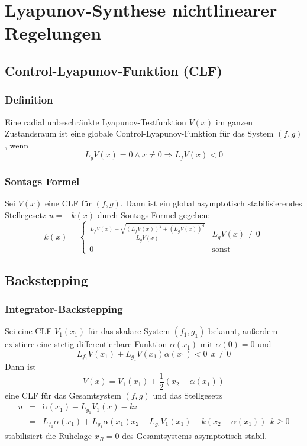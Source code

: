 \chapter{Lyapunov-Synthese nichtlinearer Regelungen}
\section{Control-Lyapunov-Funktion (CLF)}
\subsection{Definition}
Eine radial unbeschränkte Lyapunov-Testfunktion $V(x)$ im ganzen Zustandsraum ist eine
globale Control-Lyapunov-Funktion für das System $(f, g)$, wenn
\begin{equation}
    L_g V(x) = 0 \land x \neq 0 \Rightarrow L_f V(x) < 0
\end{equation}

\subsection{Sontags Formel}
Sei $V(x)$ eine CLF für $(f, g)$. Dann ist ein global asymptotisch stabilisierendes
Stellegesetz $u=-k(x)$ durch Sontags Formel gegeben:
\begin{equation}
    k(x) = \begin{cases}
        \frac{L_f V(x) + \sqrt{ {(L_f V(x))}^2 + {(L_g V(x))}^4}}{L_g V(x)} & L_g V(x) \neq 0 \\
        0 & \text{sonst}
    \end{cases}
\end{equation}

\section{Backstepping}
\subsection{Integrator-Backstepping}
Sei eine CLF $V_1(x_1)$ für das skalare System $(f_1, g_1)$ bekannt, außerdem existiere
eine stetig differentierbare Funktion $\alpha(x_1)$ mit $\alpha(0)=0$ und
\begin{equation}
    L_{f_1} V(x_1) + L_{g_1} V(x_1) \alpha(x_1) < 0\ \ x \neq 0
\end{equation}
Dann ist
\begin{equation}
    V(x) = V_1(x_1) + \frac{1}{2} (x_2 - \alpha(x_1))
\end{equation}
eine CLF für das Gesamtsystem $(f, g)$ und das Stellgesetz
\begin{eqnarray}
    u &=& \dot{\alpha}(x_1) - L_{g_1} V_1(x) - kz \\
        &=& L_{f_1} \alpha(x_1) + L_{g_1} \alpha(x_1) x_2 - L_{g_1} V_1(x_1) - k(x_2 - \alpha(x_1))\ \ k \geq 0
\end{eqnarray}
stabilisiert die Ruhelage $x_R=0$ des Gesamtsystems asymptotisch stabil.

